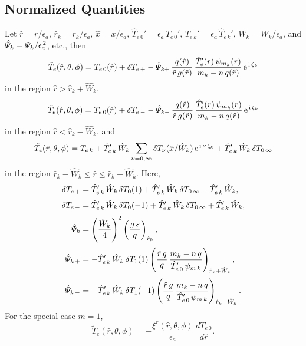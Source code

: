 \documentclass[12pt,prb,aps,notitlepage]{revtex4-1}
\begin{document}
\subsection{Normalized Quantities}
Let $\hat{r}=r/\epsilon_a$, $\hat{r}_k=r_k/\epsilon_a$, $\hat{x}= x/\epsilon_a$, $\hat{T}_{e\,0}' = \epsilon_a\,T_{e\,0}'$, $\hat{T}_{e\,k}'=\epsilon_a\,\hat{T}_{e\,k}'$, 
$\hat{W}_k = W_k/\epsilon_a$, and $\hat{\mit\Psi}_k={\mit\Psi}_k/\epsilon_a^{\,2}$, etc., 
then
\begin{equation}
\tilde{T}_e(\hat{r},\theta,\phi) = T_{e\,0}(\hat{r}) + \delta T_{e\,+} - \hat{\mit\Psi}_{k+}\,\frac{q(\hat{r})}{\hat{r}\,g(\hat{r})}\,\frac{\hat{T}_e'(r)\,\psi_{m_k}(r)}{m_k-n\,q(\hat{r})}\,{\rm e}^{\,{\rm i}\,\zeta_k}
\end{equation}
in the region $\hat{r}>\hat{r}_k+\hat{W}_k$, 
\begin{equation}
\tilde{T}_e(\hat{r},\theta,\phi) = T_{e\,0}(\hat{r}) + \delta T_{e\,-} - \hat{{\mit\Psi}}_{k-}\,\frac{q(\hat{r})}{\hat{r}\,g(\hat{r})}\,\frac{\hat{T}_e'(r)\,\psi_{m_k}(r)}{m_k-n\,q(\hat{r})}\,{\rm e}^{\,{\rm i}\,\zeta_k}
\end{equation}
in the region $\hat{r}< \hat{r}_k-\hat{W}_k$, and 
\begin{equation}
\tilde{T}_e(\hat{r}, \theta,\phi)=T_{e\,k} +\hat{T}_{e\,k}'\,\hat{W}_k\sum_{\nu=0,\infty}\delta T_\nu(\hat{x}/\hat{W}_k)\,{\rm e}^{\,{\rm i}\,\nu\,\zeta_k}+\hat{T}_{e\,k}'\,\hat{W}_k\,\delta T_{0\,\infty}
\end{equation}
in the region $\hat{r}_k-\hat{W}_k \leq \hat{r}\leq \hat{r}_k+\hat{W}_k$. Here, 
\begin{align}
\delta T_{e\,+} &= \hat{T}_{e\,k}'\,\hat{W}_k\,\delta T_0(1)+\hat{T}_{e\,k}'\,\hat{W}_k\,\delta T_{0\,\infty} - \hat{T}_{e\,k}'\,\hat{W}_k,\\[0.5ex]
\delta T_{e\,-} &=\hat{T}_{e\,k}'\,\hat{W}_k\,\delta T_0(-1) +\hat{T}_{e\,k}'\,\hat{W}_k\,\delta T_{0\,\infty} +\hat{T}_{e\,k}'\,\hat{W}_k,\\[0.5ex]
\hat{\mit\Psi}_k&=\left(\frac{\hat{W}_k}{4}\right)^2\left(\frac{g\,s}{q}\right)_{\hat{r}_k},\\[0.5ex]
\hat{\mit\Psi}_{k\,+} &= - \hat{T}_{e\,k}'\,\hat{W}_k\,\delta T_1(1)\left(\frac{\hat{r}\,g}{q}\,\frac{m_k-n\,q}{\hat{T}_{e\,0}'\,\psi_{m\,k}}\right)_{\hat{r}_k+\hat{W}_k},\\[0.5ex]
\hat{\mit\Psi}_{k\,-} &= -\hat{T}_{e\,k}'\,\hat{W}_k\,\delta T_1(-1)\left(\frac{\hat{r}\,g}{q}\,\frac{m_k-n\,q}{\hat{T}_{e\,0}'\,\psi_{m\,k}}\right)_{\hat{r}_k-\hat{W}_k}.
\end{align}
For the special case $m=1$, 
\begin{equation}
\tilde{T}_e(\hat{r},\theta,\phi) = - \frac{\xi^r(\hat{r},\theta,\phi)}{\epsilon_a}\,\frac{ dT_{e\,0}}{d\hat{r}}.
\end{equation}
\end{document}
